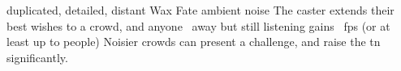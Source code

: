   {duplicated, detailed, distant}%
  {Wax}%
  {Fate}%
  {ambient noise}%
  {The caster extends their best wishes to a crowd, and anyone \spellRange\ away but still listening gains ~\glspl{fp} (or at least up to  people)}%
  {Noisier crowds can present a challenge, and raise the \gls{tn} significantly.}
